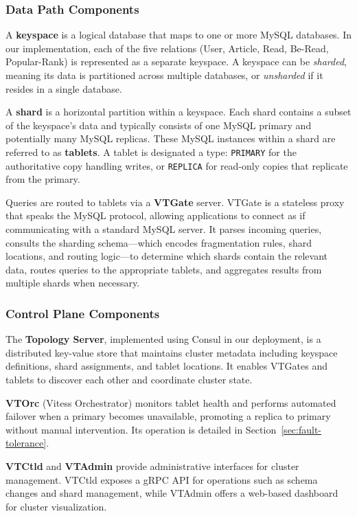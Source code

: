 \documentclass{article}
\begin{document}
\subsubsection{Data Path Components}

A \textbf{keyspace} is a logical database that maps to one or more MySQL databases. In our implementation, each of the five relations (User, Article, Read, Be-Read, Popular-Rank) is represented as a separate keyspace. A keyspace can be \emph{sharded}, meaning its data is partitioned across multiple databases, or \emph{unsharded} if it resides in a single database.

A \textbf{shard} is a horizontal partition within a keyspace. Each shard contains a subset of the keyspace's data and typically consists of one MySQL primary and potentially many MySQL replicas. These MySQL instances within a shard are referred to as \textbf{tablets}. A tablet is designated a type: \texttt{PRIMARY} for the authoritative copy handling writes, or \texttt{REPLICA} for read-only copies that replicate from the primary.

Queries are routed to tablets via a \textbf{VTGate} server. VTGate is a stateless proxy that speaks the MySQL protocol, allowing applications to connect as if communicating with a standard MySQL server. It parses incoming queries, consults the sharding schema---which encodes fragmentation rules, shard locations, and routing logic---to determine which shards contain the relevant data, routes queries to the appropriate tablets, and aggregates results from multiple shards when necessary.

\subsubsection{Control Plane Components}

The \textbf{Topology Server}, implemented using Consul in our deployment, is a distributed key-value store that maintains cluster metadata including keyspace definitions, shard assignments, and tablet locations. It enables VTGates and tablets to discover each other and coordinate cluster state.

\textbf{VTOrc} (Vitess Orchestrator) monitors tablet health and performs automated failover when a primary becomes unavailable, promoting a replica to primary without manual intervention. Its operation is detailed in Section~\ref{sec:fault-tolerance}.

\textbf{VTCtld} and \textbf{VTAdmin} provide administrative interfaces for cluster management. VTCtld exposes a gRPC API for operations such as schema changes and shard management, while VTAdmin offers a web-based dashboard for cluster visualization.
\end{document}
